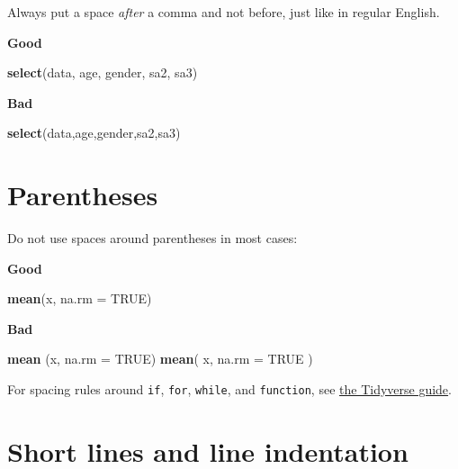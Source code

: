 \documentclass[]{book}
\newenvironment{Shaded}{\begin{snugshade}}{\end{snugshade}}
\newcommand{\DataTypeTok}[1]{\textcolor[rgb]{0.13,0.29,0.53}{#1}}
\newcommand{\KeywordTok}[1]{\textcolor[rgb]{0.13,0.29,0.53}{\textbf{#1}}}
\newcommand{\NormalTok}[1]{#1}
\newcommand{\OtherTok}[1]{\textcolor[rgb]{0.56,0.35,0.01}{#1}}
\begin{document}
Always put a space \emph{after} a comma and not before, just like in regular English.

\textbf{Good}

\begin{Shaded}
\begin{Highlighting}[]
\KeywordTok{select}\NormalTok{(data, age, gender, sa2, sa3)}
\end{Highlighting}
\end{Shaded}

\textbf{Bad}

\begin{Shaded}
\begin{Highlighting}[]
\KeywordTok{select}\NormalTok{(data,age,gender,sa2,sa3)}
\end{Highlighting}
\end{Shaded}

\hypertarget{parentheses}{%
\section{Parentheses}\label{parentheses}}

Do not use spaces around parentheses in most cases:

\textbf{Good}

\begin{Shaded}
\begin{Highlighting}[]
\KeywordTok{mean}\NormalTok{(x, }\DataTypeTok{na.rm =} \OtherTok{TRUE}\NormalTok{)}
\end{Highlighting}
\end{Shaded}

\textbf{Bad}

\begin{Shaded}
\begin{Highlighting}[]
\KeywordTok{mean}\NormalTok{ (x, }\DataTypeTok{na.rm =} \OtherTok{TRUE}\NormalTok{)}
\KeywordTok{mean}\NormalTok{( x, }\DataTypeTok{na.rm =} \OtherTok{TRUE}\NormalTok{ )}
\end{Highlighting}
\end{Shaded}

For spacing rules around \texttt{if}, \texttt{for}, \texttt{while}, and \texttt{function}, see \href{https://style.tidyverse.org/syntax.html\#parentheses}{the Tidyverse guide}.

\hypertarget{short-lines-and-line-indentation}{%
\section{Short lines and line indentation}\label{short-lines-and-line-indentation}}
\end{document}
